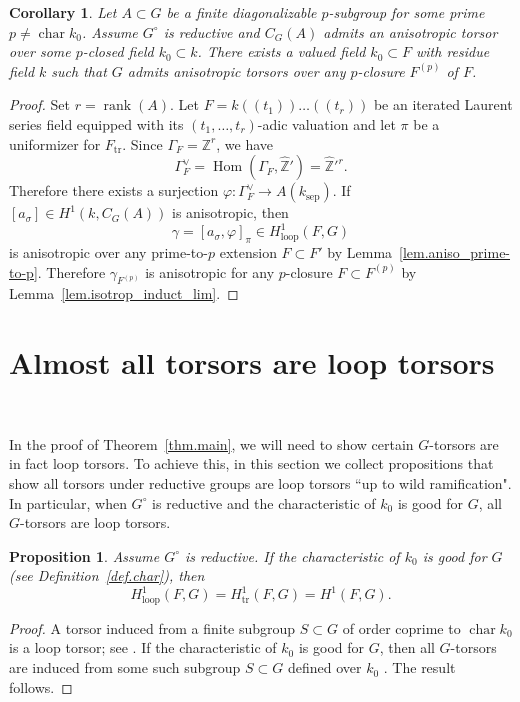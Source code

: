 \documentclass[12pt]{amsart}
\numberwithin{equation}{section}
\newtheorem{proposition}[theorem]{Proposition}
\newtheorem{corollary}[theorem]{Corollary}
\theoremstyle{definition}
\newcommand{\bZ}{\mathbb{Z}}
\newcommand{\Hom}{\operatorname{Hom}}
\newcommand{\rank}{\operatorname{rank}}
\newcommand{\sep}{\operatorname{sep}}
\newcommand{\Char}{\operatorname{char}}
\newcommand{\tr}{\operatorname{tr}}
\newcommand{\ksep}{k_{\sep}}
\newcommand{\Ftr}{F_{\tr}}
\newcommand{\vphi}{\varphi}
\newcommand{\I}[1]{\Gamma_{#1}^{\vee}}
\newcommand{\lop}{\operatorname{loop}}
\begin{document}
\begin{corollary}\label{cor.if_cent_admits_aniso_so_does_G}
    Let $A\subset G$ be a finite diagonalizable $p$-subgroup for some prime $p\neq \Char k_0$. Assume $G^{\circ}$ is reductive and $C_G(A)$ admits an anisotropic torsor over some $p$-closed field $k_0\subset k$. There exists a valued field $k_0\subset F$ with residue field $k$ such that $G$ admits anisotropic torsors over any $p$-closure $F^{(p)}$ of $F$. 
\end{corollary}
\begin{proof}
    Set $r=\rank(A)$. Let $F = k(\!(t_1)\!)\dots(\!(t_r)\!)$ be an iterated Laurent series field equipped with its $(t_1,\dots,t_r)$-adic valuation and let $\pi$ be a uniformizer for $\Ftr$.  Since $\Gamma_F = \bZ^r$, we have $$\I{F} = \Hom(\Gamma_F,\hat{\bZ}')= \hat{\bZ}'^r.$$ Therefore there exists a surjection $\vphi : \I{F} \to A(\ksep)$. If $[a_\sigma]\in H^1(k,C_G(A))$ is anisotropic, then
    $$\gamma= [a_\sigma,\vphi]_\pi \in H^1_{\lop}(F,G)$$
    is anisotropic over any prime-to-$p$ extension $F\subset F'$ by Lemma~\ref{lem.aniso_prime-to-p}. Therefore $\gamma_{F^{(p)}}$ is anisotropic for any $p$-closure $F\subset F^{(p)}$ by Lemma~\ref{lem.isotrop_induct_lim}.
\end{proof}

\section{Almost all torsors are loop torsors}~\label{sect.all_torsors_are_loops}

In the proof of Theorem~\ref{thm.main}, we will need to show certain $G$-torsors are in fact loop torsors. To achieve this, in this section we collect propositions that show all torsors under reductive groups are loop torsors ``up to wild ramification". In particular, when $G^{\circ}$ is reductive and the characteristic of $k_0$ is good for $G$, all $G$-torsors are loop torsors.

\begin{proposition}\label{lem.loop_char_good}
    Assume $G^{\circ}$ is reductive. If the characteristic of $k_0$ is good for $G$ (see Definition~\ref{def.char}), then $$H^1_{\lop}(F,G) = H^1_{\tr}(F,G) = H^1(F,G).$$
\end{proposition}
\begin{proof}
 A torsor induced from a finite subgroup $S\subset G$ of order coprime to $\Char k_0$ is a loop torsor; see \cite[Lemma 3.12]{gille2013torsors}. If the characteristic of $k_0$ is good for $G$, then all $G$-torsors are induced from some such subgroup $S\subset G$ defined over $k_0$ \cite[Corollary 18]{lucchini2015groupe}. The result follows.
\end{proof}
\end{document}
